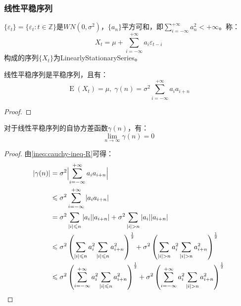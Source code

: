 \subsubsection{线性平稳序列}
\begin{definition}
	$\{\varepsilon_t\}=\{\varepsilon_t:t\in\mathbb{Z}\}$是$WN(0,\sigma^2)$，$\{a_n\}$平方可和，即$\sum\limits_{i=-\infty}^{+\infty}a_n^2<+\infty$。称：
	\begin{equation*}
		X_t=\mu+\sum_{i=-\infty}^{+\infty}a_i\varepsilon_{t-i}
	\end{equation*}
	构成的序列$\{X_t\}$为\gls{LinearlyStationarySeries}。
\end{definition}
\begin{theorem}
	线性平稳序列是平稳序列，且有：
	\begin{equation*}
		\operatorname{E}(X_t)=\mu,\;\gamma(n)=\sigma^2\sum_{i=-\infty}^{+\infty}a_ia_{i+n}
	\end{equation*}
\end{theorem}
\begin{proof}
	
\end{proof}
\begin{theorem}
	对于线性平稳序列的自协方差函数$\gamma(n)$，有：
	\begin{equation*}
		\lim_{n\to\infty}\gamma(n)=0
	\end{equation*}
\end{theorem}
\begin{proof}
	由\cref{ineq:cauchy-ineq-R}可得：
	\begin{align*}
		|\gamma(n)|
		&=\sigma^2\Bigl|\sum_{i=-\infty}^{+\infty}a_ia_{i+n}\Bigr| \\
		&\leqslant\sigma^2\sum_{i=-\infty}^{+\infty}|a_ia_{i+n}| \\
		&=\sigma^2\sum_{|i|\leqslant n}|a_i||a_{i+n}|+\sigma^2\sum_{|i|> n}|a_i||a_{i+n}| \\
		&\leqslant\sigma^2\left(\sum_{|i|\leqslant n}a_i^2\sum_{|i|\leqslant n}a_{i+n}^2\right)^\frac{1}{2}+\sigma^2\left(\sum_{|i|>n}a_i^2\sum_{|i|>n}a_{i+n}^2\right)^\frac{1}{2} \\
		&\leqslant\sigma^2\left(\sum_{i=-\infty}^{+\infty}a_i^2\sum_{|i|\leqslant n}a_{i+n}^2\right)^\frac{1}{2}+\sigma^2\left(\sum_{i=-\infty}^{+\infty}a_i^2\sum_{|i|>n}a_{i+n}^2\right)^\frac{1}{2}
	\end{align*}
\end{proof}








